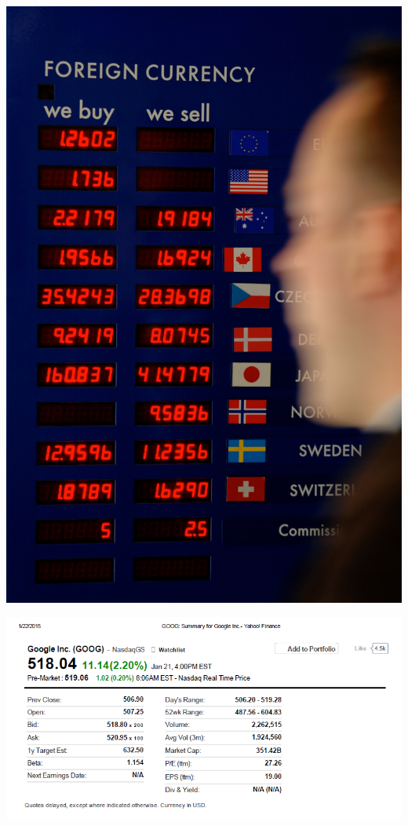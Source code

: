 \documentclass[english,10pt
,aspectratio=169
]{beamer}
\begin{document}
\begin{frame}
	\centering
	\includegraphics[width=.3\paperwidth]{pics/Image_XRates}
\end{frame}


\begin{frame}
	\centering
	\includegraphics[width=1\linewidth]{pics/StockSummary_Google}
\end{frame}
\end{document}

